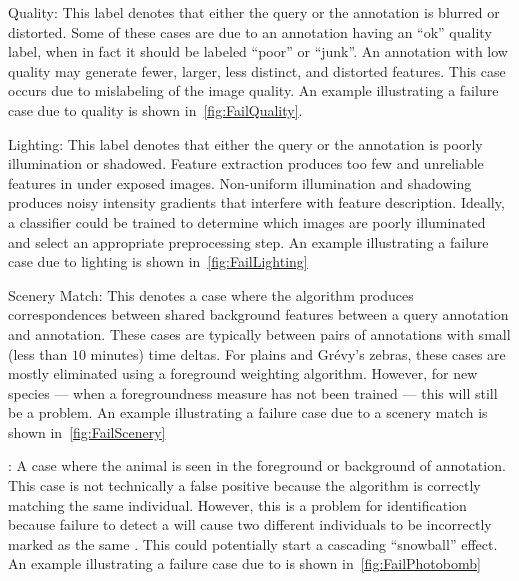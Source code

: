 \begin{itemln}
                \FailOcclusion{}

            \item Quality:
            This label denotes that either the query or the \groundtrue{} annotation is blurred or distorted.
            Some of these cases are due to an annotation having an ``ok'' quality label, when in fact it should
              be labeled ``poor'' or ``junk''.
            An annotation with low quality may generate fewer, larger, less distinct, and distorted features.
            This case occurs due to mislabeling of the image quality.
            An example illustrating a failure case due to quality is shown in~\cref{fig:FailQuality}.

                \FailQuality{}

            \item Lighting:
            This label denotes that either the query or the \groundtrue{} annotation is poorly illumination or
              shadowed.
            Feature extraction produces too few and unreliable features in under exposed images.
            Non-uniform illumination and shadowing produces noisy intensity gradients that interfere with feature
              description.
            Ideally, a classifier could be trained to determine which images are poorly illuminated and select an
              appropriate preprocessing step.
            An example illustrating a failure case due to lighting is shown in~\cref{fig:FailLighting}

                \FailLighting{}

            \item Scenery Match:
            This denotes a case where the algorithm produces correspondences between shared background features
              between a query annotation and \aan{\groundfalse{}} annotation.
            These cases are typically between pairs of annotations with small (less than $10$ minutes) time
              deltas.
            For plains and Grévy's zebras, these cases are mostly eliminated using a foreground weighting
              algorithm.
            However, for new species --- when a foregroundness measure has not been trained --- this will still
              be a problem.
            An example illustrating a failure case due to a scenery match is shown in~\cref{fig:FailScenery}

              \FailScenery{}

            \item \Photobomb{}:
            A case where the \groundtrue{} animal is seen in the foreground or background of \aan{\groundfalse{}}
              annotation.
            This case is not technically a false positive because the algorithm is correctly matching the same
              individual.
            However, this is a problem for identification because failure to detect a \photobomb{} will cause two
              different individuals to be incorrectly marked as the same \name{}.
            This could potentially start a cascading ``snowball'' effect.
            An example illustrating a failure case due to \photobombing{} is shown in~\cref{fig:FailPhotobomb}


\end{itemln}
